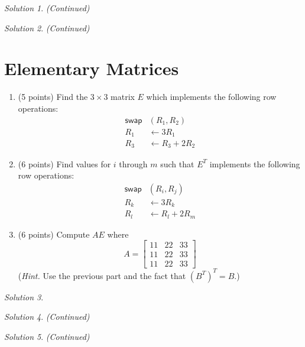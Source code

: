 \documentclass{article}
\theoremstyle{remark} \newtheorem*{solution}{Solution}
\begin{document}
\pagebreak
\begin{solution}
  \textit{(Continued)}
\end{solution}

\pagebreak
\begin{solution}
  \textit{(Continued)}
\end{solution}

\pagebreak
\section{Elementary Matrices}

\begin{enumerate}
\item
  (5 points) Find the $3 \times 3$ matrix $E$ which implements the
  following row operations:
  \begin{align*}
    \mathsf{swap}&(R_1, R_2) \\ R_1 &\gets 3R_1 \\ R_3 &\gets R_3 + 2
    R_2
  \end{align*}
\item
  (6 points) Find values for $i$ through $m$ such that $E^T$
  implements the following row operations:
  \begin{align*}
    \mathsf{swap}&(R_i, R_j) \\ R_k &\gets 3R_k \\ R_l &\gets R_l + 2
    R_m
  \end{align*}
\item
  (6 points) Compute $AE$ where
  \begin{displaymath}
    A =
    \begin{bmatrix}
      11 & 22 & 33 \\ 11 & 22 & 33 \\ 11 & 22 & 33
    \end{bmatrix}
  \end{displaymath}
  (\textit{Hint.} Use the previous part and the fact that $(B^T)^T =
  B$.)
\end{enumerate}

\medskip

\begin{solution}
\end{solution}

\pagebreak
\begin{solution}
  \textit{(Continued)}
\end{solution}

\pagebreak
\begin{solution}
  \textit{(Continued)}
\end{solution}
\end{document}
